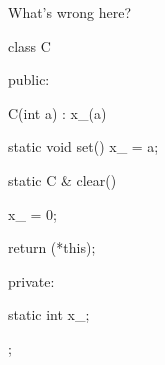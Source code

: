 What's wrong here?



\begin{consolethree}[escapeinside=||]

class C

{

public:

    C(int a) : x_(a) {}

    static void set() { x_ = a; }

    static C & clear()

    {

        x_ = 0;

        return (*this);

    }

private:

    static int x_;

};

\end{consolethree}

